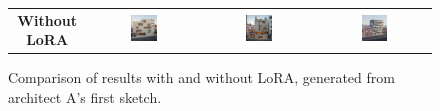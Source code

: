 \begin{figure}[H]
{\begin{tabular}{c c c c}
    \textbf{Without LoRA} &
    \includegraphics[width=0.25\textwidth]{Images/Results/Architect-A_unstructured-phase/generated_images/1/Zonder_lora_00001_.png} &
    \includegraphics[width=0.25\textwidth]{Images/Results/Architect-A_unstructured-phase/generated_images/1/Zonder_lora_00002_.png} &
    \includegraphics[width=0.25\textwidth]{Images/Results/Architect-A_unstructured-phase/generated_images/1/Zonder_lora_00005_.png} \\
  \end{tabular}
  }
  \caption{Comparison of results with and without LoRA, generated from architect A's first sketch.}
  \label{fig:lora-comparison}
\end{figure}
